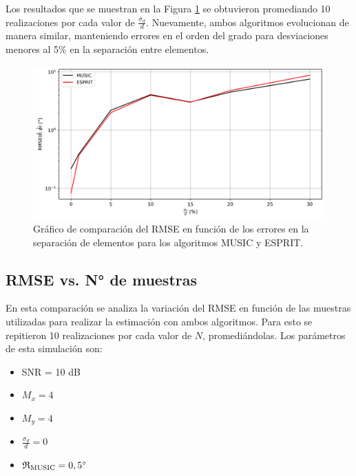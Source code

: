 Los resultados que se muestran en la Figura \ref{fig:doaest_error_vs_d_error} se obtuvieron promediando 10 realizaciones por cada valor de $\frac{\sigma_d}{d}$. Nuevamente, ambos algoritmos evolucionan de manera similar, manteniendo errores en el orden del grado para desviaciones menores al 5\% en la separación entre elementos.
\begin{figure}[ht!]
    \centering
    \includegraphics[width=0.9\linewidth]{images/03-DOAEst/error_vs_d_error.png}
    \caption{Gráfico de comparación del RMSE en función de los errores en la separación de elementos para los algoritmos MUSIC y ESPRIT.}
    \label{fig:doaest_error_vs_d_error}
\end{figure}

\subsection{RMSE vs. N° de muestras} %

En esta comparación se analiza la variación del RMSE en función de las muestras utilizadas para realizar la estimación con ambos algoritmos. Para esto se repitieron 10 realizaciones por cada valor de $N$, promediándolas. Los parámetros de esta simulación son:
\begin{itemize}
    \item SNR = 10 dB
    \item $M_x = 4$
    \item $M_y = 4$
    \item $\frac{\sigma_d}{d}=0$
    \item $\mathfrak{R}_{\textrm{MUSIC}}=0,5^{\circ}$
\end{itemize}

